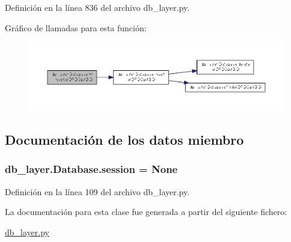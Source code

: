 Definición en la línea 836 del archivo db\-\_\-layer.\-py.



Gráfico de llamadas para esta función\-:\nopagebreak
\begin{figure}[H]
\begin{center}
\leavevmode
\includegraphics[width=350pt]{classdb__layer_1_1_database_abf6ce37aea5202f161dbd3e3c41d6a6e_cgraph}
\end{center}
\end{figure}




\subsection{Documentación de los datos miembro}
\hypertarget{classdb__layer_1_1_database_a232d5477efc9b4c8d8a36b7541c851e1}{
\subsubsection[{session}]{\setlength{\rightskip}{0pt plus 5cm}db\-\_\-layer.\-Database.\-session = None\hspace{0.3cm}{\ttfamily [static]}}}\label{classdb__layer_1_1_database_a232d5477efc9b4c8d8a36b7541c851e1}


Definición en la línea 109 del archivo db\-\_\-layer.\-py.



La documentación para esta clase fue generada a partir del siguiente fichero\-:\begin{DoxyCompactItemize}
\item 
\hyperlink{db__layer_8py}{db\-\_\-layer.\-py}\end{DoxyCompactItemize}
